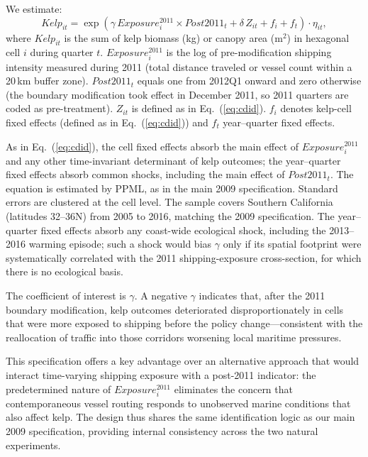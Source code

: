 \documentclass[12pt]{article}
\begin{document}
We estimate:
\begin{equation}
Kelp_{it}=\exp\!\left(\gamma\,Exposure_{i}^{2011}\times \mathit{Post2011}_{t}+\delta\,Z_{it}+f_{i}+f_{t}\right)\cdot\eta_{it},
\label{eq:cdid2011}
\end{equation}
where $Kelp_{it}$ is the sum of kelp biomass (kg) or canopy area (m$^{2}$) in hexagonal cell $i$ during quarter $t$. $Exposure_{i}^{2011}$ is the log of pre-modification shipping intensity measured during 2011 (total distance traveled or vessel count within a 20\,km buffer zone). $\mathit{Post2011}_{t}$ equals one from 2012Q1 onward and zero otherwise (the boundary modification took effect in December 2011, so 2011 quarters are coded as pre-treatment). $Z_{it}$ is defined as in Eq.~(\ref{eq:cdid}). $f_{i}$ denotes kelp-cell fixed effects (defined as in Eq.~(\ref{eq:cdid})) and $f_{t}$ year--quarter fixed effects.

As in Eq.~(\ref{eq:cdid}), the cell fixed effects absorb the main effect of $Exposure_{i}^{2011}$ and any other time-invariant determinant of kelp outcomes; the year--quarter fixed effects absorb common shocks, including the main effect of $\mathit{Post2011}_{t}$. The equation is estimated by PPML, as in the main 2009 specification. Standard errors are clustered at the cell level. The sample covers Southern California (latitudes 32\textdegree--36\textdegree N) from 2005 to 2016, matching the 2009 specification. The year--quarter fixed effects absorb any coast-wide ecological shock, including the 2013--2016 warming episode; such a shock would bias $\gamma$ only if its spatial footprint were systematically correlated with the 2011 shipping-exposure cross-section, for which there is no ecological basis.

The coefficient of interest is $\gamma$. A negative $\gamma$ indicates that, after the 2011 boundary modification, kelp outcomes deteriorated disproportionately in cells that were more exposed to shipping before the policy change---consistent with the reallocation of traffic into those corridors worsening local maritime pressures.

This specification offers a key advantage over an alternative approach that would interact time-varying shipping exposure with a post-2011 indicator: the predetermined nature of $Exposure_{i}^{2011}$ eliminates the concern that contemporaneous vessel routing responds to unobserved marine conditions that also affect kelp. The design thus shares the same identification logic as our main 2009 specification, providing internal consistency across the two natural experiments.
\end{document}

